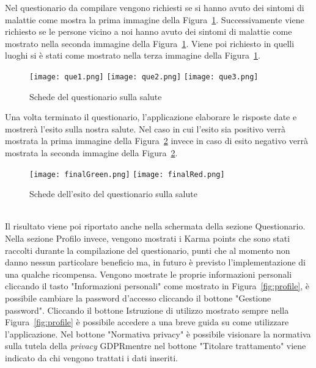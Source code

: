 \begin{trivlist}
	Nel questionario da compilare vengono richiesti se si hanno avuto dei sintomi di malattie come mostra la prima immagine della Figura~\ref{fig:queSlide}. Successivamente viene richiesto se le persone vicino a noi hanno avuto dei sintomi di malattie come mostrato nella seconda immagine della Figura~\ref{fig:queSlide}. Viene poi richiesto in quelli luoghi si è stati come mostrato nella terza immagine della Figura~\ref{fig:queSlide}.
	\begin{figure}[h]
		\begin{center}
			\texttt{[image: que1.png]}\hfill
			\texttt{[image: que2.png]}\hfill
			\texttt{[image: que3.png]}
			\caption{Schede del questionario sulla salute}\label{fig:queSlide}
		\end{center}
	\end{figure}
	Una volta terminato il questionario, l'applicazione elaborare le risposte date e mostrerà l'esito sulla nostra salute. Nel caso in cui l'esito sia positivo verrà mostrata la prima immagine della Figura~\ref{fig:quefinal} invece in caso di esito negativo verrà mostrata la seconda immagine della Figura~\ref{fig:quefinal}.
	\begin{figure}[h]
		\begin{center}
			\texttt{[image: finalGreen.png]}\hfil
			\texttt{[image: finalRed.png]}
			\caption{Schede dell'esito del questionario sulla salute}\label{fig:quefinal}
		\end{center}
	\end{figure}\\
	Il risultato viene poi riportato anche nella schermata della sezione Questionario.
	\\
	Nella sezione Profilo invece, vengono mostrati i Karma points che sono stati raccolti durante la compilazione del questionario, punti che al momento non danno nessun particolare beneficio ma, in futuro è previsto l'implementazione di una qualche ricompensa. Vengono mostrate le proprie informazioni personali cliccando il tasto "Informazioni personali" come mostrato in Figura~\ref{fig:profile}, è possibile cambiare la password d'accesso cliccando il bottone "Gestione password". Cliccando il bottone Istruzione di utilizzo mostrato sempre nella Figura~\ref{fig:profile} è possibile accedere a una breve guida su come utilizzare l'applicazione. Nel bottone "Normativa privacy" è possibile visionare la normativa sulla tutela della \emph{privacy} \gls{GDPR}\glsfirstoccur mentre nel bottone "Titolare trattamento" viene indicato da chi vengono trattati i dati inseriti.

\end{trivlist}
